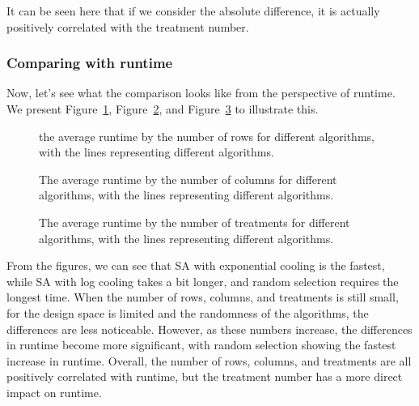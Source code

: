 \documentclass[
  a4paper,
  oneside,
  openany,
  12pt,
  onecolumn]{book}
\theoremstyle{definition}
\theoremstyle{definition}
\theoremstyle{plain}
\theoremstyle{remark}
\begin{document}
It can be seen here that if we consider the absolute difference, it is
actually positively correlated with the treatment number.

\subsubsection{Comparing with runtime}\label{comparing-with-runtime}

Now, let's see what the comparison looks like from the perspective of
runtime. We present Figure~\ref{fig-RvT}, Figure~\ref{fig-CvT}, and
Figure~\ref{fig-TvT} to illustrate this.

\begin{figure}


\caption{\label{fig-RvT}the average runtime by the number of rows for
different algorithms, with the lines representing different algorithms.}

\end{figure}%

\begin{figure}


\caption{\label{fig-CvT}The average runtime by the number of columns for
different algorithms, with the lines representing different algorithms.}

\end{figure}%

\begin{figure}


\caption{\label{fig-TvT}The average runtime by the number of treatments
for different algorithms, with the lines representing different
algorithms.}

\end{figure}%

From the figures, we can see that SA with exponential cooling is the
fastest, while SA with log cooling takes a bit longer, and random
selection requires the longest time. When the number of rows, columns,
and treatments is still small, for the design space is limited and the
randomness of the algorithms, the differences are less noticeable.
However, as these numbers increase, the differences in runtime become
more significant, with random selection showing the fastest increase in
runtime. Overall, the number of rows, columns, and treatments are all
positively correlated with runtime, but the treatment number has a more
direct impact on runtime.
\end{document}
